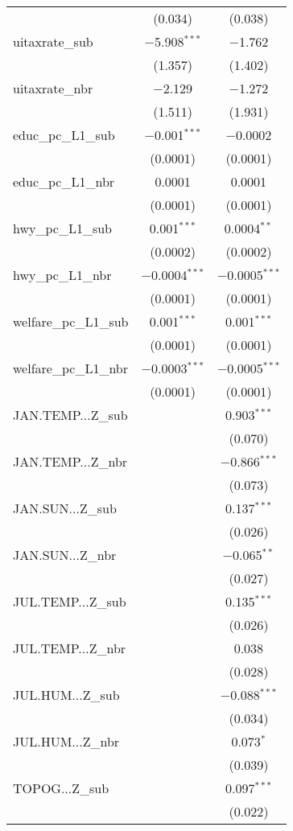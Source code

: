 \begin{table}[!htbp]
\begin{tabular}{@{\extracolsep{5pt}}lcc}
  & (0.034) & (0.038) \\ 
  uitaxrate\_sub & $-$5.908$^{***}$ & $-$1.762 \\ 
  & (1.357) & (1.402) \\ 
  uitaxrate\_nbr & $-$2.129 & $-$1.272 \\ 
  & (1.511) & (1.931) \\ 
  educ\_pc\_L1\_sub & $-$0.001$^{***}$ & $-$0.0002 \\ 
  & (0.0001) & (0.0001) \\ 
  educ\_pc\_L1\_nbr & 0.0001 & 0.0001 \\ 
  & (0.0001) & (0.0001) \\ 
  hwy\_pc\_L1\_sub & 0.001$^{***}$ & 0.0004$^{**}$ \\ 
  & (0.0002) & (0.0002) \\ 
  hwy\_pc\_L1\_nbr & $-$0.0004$^{***}$ & $-$0.0005$^{***}$ \\ 
  & (0.0001) & (0.0001) \\ 
  welfare\_pc\_L1\_sub & 0.001$^{***}$ & 0.001$^{***}$ \\ 
  & (0.0001) & (0.0001) \\ 
  welfare\_pc\_L1\_nbr & $-$0.0003$^{***}$ & $-$0.0005$^{***}$ \\ 
  & (0.0001) & (0.0001) \\ 
  JAN.TEMP...Z\_sub &  & 0.903$^{***}$ \\ 
  &  & (0.070) \\ 
  JAN.TEMP...Z\_nbr &  & $-$0.866$^{***}$ \\ 
  &  & (0.073) \\ 
  JAN.SUN...Z\_sub &  & 0.137$^{***}$ \\ 
  &  & (0.026) \\ 
  JAN.SUN...Z\_nbr &  & $-$0.065$^{**}$ \\ 
  &  & (0.027) \\ 
  JUL.TEMP...Z\_sub &  & 0.135$^{***}$ \\ 
  &  & (0.026) \\ 
  JUL.TEMP...Z\_nbr &  & 0.038 \\ 
  &  & (0.028) \\ 
  JUL.HUM...Z\_sub &  & $-$0.088$^{***}$ \\ 
  &  & (0.034) \\ 
  JUL.HUM...Z\_nbr &  & 0.073$^{*}$ \\ 
  &  & (0.039) \\ 
  TOPOG...Z\_sub &  & 0.097$^{***}$ \\ 
  &  & (0.022) \\ 

\end{tabular}
\end{table}
